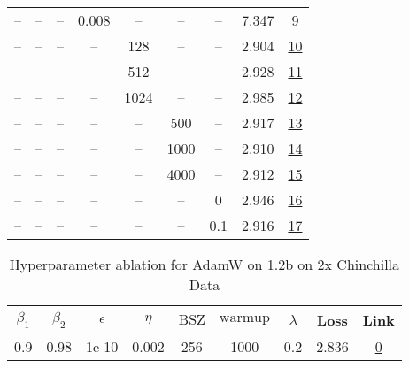 \begin{table}[H]
\begin{tabular}{ccccccccc}
-- & -- & -- & 0.008 & -- & -- & -- & 7.347 & \href{https://wandb.ai/stanford-mercury/optimizer-scaling/runs/sweep-1.2b-24B-adamw4476fflr0.008-wd0.2-minlr0-warmup2000-b10.9--5acee7}{9} \\
-- & -- & -- & -- & 128 & -- & -- & 2.904 & \href{https://wandb.ai/stanford-mercury/optimizer-scaling/runs/sweep-1.2b-24B-adamwc221ealr0.002-wd0.2-minlr0-warmup2000-b10.9--d14fe4}{10} \\
-- & -- & -- & -- & 512 & -- & -- & 2.928 & \href{https://wandb.ai/stanford-mercury/optimizer-scaling/runs/sweep-1.2b-24B-adamwb10b19lr0.002-wd0.2-minlr0-warmup2000-b10.9--2fcef1}{11} \\
-- & -- & -- & -- & 1024 & -- & -- & 2.985 & \href{https://wandb.ai/stanford-mercury/optimizer-scaling/runs/sweep-1.2b-24B-adamwf0dd70lr0.002-wd0.2-minlr0-warmup2000-b10.9--751ff8}{12} \\
-- & -- & -- & -- & -- & 500 & -- & 2.917 & \href{https://wandb.ai/stanford-mercury/optimizer-scaling/runs/sweep-1.2b-24B-adamw82e04dlr0.002-wd0.2-minlr0-warmup500-b10.9-b-4a7d30}{13} \\
-- & -- & -- & -- & -- & 1000 & -- & 2.910 & \href{https://wandb.ai/stanford-mercury/optimizer-scaling/runs/sweep-1.2b-24B-adamw613e35lr0.002-wd0.2-minlr0.0-warmup1000.0-b1-25ef51}{14} \\
-- & -- & -- & -- & -- & 4000 & -- & 2.912 & \href{https://wandb.ai/stanford-mercury/optimizer-scaling/runs/sweep-1.2b-24B-adamwf0120blr0.002-wd0.2-minlr0-warmup4000-b10.9--72e36e}{15} \\
-- & -- & -- & -- & -- & -- & 0 & 2.946 & \href{https://wandb.ai/stanford-mercury/optimizer-scaling/runs/sweep-1.2b-24B-adamw400796lr0.002-wd0-minlr0-warmup2000-b10.9-b2-78071b}{16} \\
-- & -- & -- & -- & -- & -- & 0.1 & 2.916 & \href{https://wandb.ai/stanford-mercury/optimizer-scaling/runs/sweep-1.2b-24B-adamw8fd298lr0.002-wd0.1-minlr0-warmup2000-b10.9--2ccc79}{17} \\
\bottomrule
\end{tabular}
\end{table}

\begin{table}[H]
\centering
\caption{Hyperparameter ablation for AdamW on 1.2b on 2x Chinchilla Data}
\label{tab:ablation_adamw_1.2b_2}
\begin{tabular}{ccccccccc}
\toprule
$\beta_1$ & $\beta_2$ & $\epsilon$ & $\eta$ & $\mathrm{BSZ}$ & $\mathrm{warmup}$ & $\lambda$ & Loss & Link \\
\midrule
0.9 & 0.98 & 1e-10 & 0.002 & 256 & 1000 & 0.2 & 2.836 & \href{https://wandb.ai/stanford-mercury/optimizer-scaling/runs/sweep-1.2b-48B-adamw7ebb9alr0.002-wd0.2-minlr0.0-warmup1000-b10.-994f23}{0} \\
\midrule
\bottomrule
\end{tabular}
\end{table}

